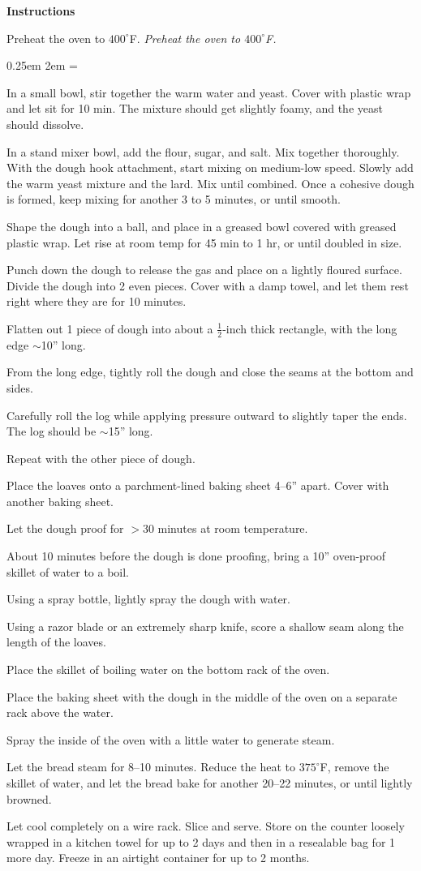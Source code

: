 \documentclass{article}
\newcommand{\temp}[1]{$#1^\circ$F}
\newcounter{stepnum}
\newenvironment{method}[1][]{
    \setcounter{stepnum}{0}
    \noindent
    {\color{red}\Large\textbf{Instructions}}
    \par
    \smallskip
    \if#1
    \else
        \noindent
        \emph{#1}
        \par
    \fi
    \begingroup
    \parindent0pt
    \parskip0.25em
        \leftskip2em
    \everypar={\llap{\ensuremath{\stepcounter{stepnum}\hbox to2em{\thestepnum.\hfill}}}}
}{%
    \par
    \endgroup
}
\begin{document}
\begin{method}[Preheat the oven to \temp{400}.]
    In a small bowl, stir together the warm water and yeast. Cover with plastic wrap and let sit for 10 min. The mixture should get slightly foamy, and the yeast should dissolve.\par
    In a stand mixer bowl, add the flour, sugar, and salt. Mix together thoroughly. With the dough hook attachment, start mixing on medium-low speed. Slowly add the warm yeast mixture and the lard. Mix until combined. Once a cohesive dough is formed, keep mixing for another 3 to 5 minutes, or until smooth.\par
    Shape the dough into a ball, and place in a greased bowl covered with greased plastic wrap. Let rise at room temp for 45 min to 1 hr, or until doubled in size.\par
    Punch down the dough to release the gas and place on a lightly floured surface. Divide the dough into 2 even pieces. Cover with a damp towel, and let them rest right where they are for 10 minutes.\par
    Flatten out 1 piece of dough into about a $\frac{1}{2}$-inch thick rectangle, with the long edge $\sim$10'' long.\par
    From the long edge, tightly roll the dough and close the seams at the bottom and sides.\par
    Carefully roll the log while applying pressure outward to \linebreak slightly taper the ends. The log should be $\sim$15'' long.\par
    Repeat with the other piece of dough.\par
    Place the loaves onto a parchment-lined baking sheet 4--6'' apart. Cover with another baking sheet.\par
    Let the dough proof for $>$30 minutes at room temperature.\par
    About 10 minutes before the dough is done proofing, bring a 10'' oven-proof skillet of water to a boil.\par
    Using a spray bottle, lightly spray the dough with water.\par
    Using a razor blade or an extremely sharp knife, score a shallow seam along the length of the loaves.\par
    Place the skillet of boiling water on the bottom rack of the oven.\par
    Place the baking sheet with the dough in the middle of the oven on a separate rack above the water.\par
    Spray the inside of the oven with a little water to generate steam.\par
    Let the bread steam for 8--10 minutes. Reduce the heat to \temp{375}, remove the skillet of water, and let the bread bake for another 20--22 minutes, or until lightly browned.\par
    Let cool completely on a wire rack. Slice and serve. Store on the counter loosely wrapped in a kitchen towel for up to 2 days and then in a resealable bag for 1 more day. Freeze in an airtight container for up to 2 months.\par
\end{method}
\end{document}
